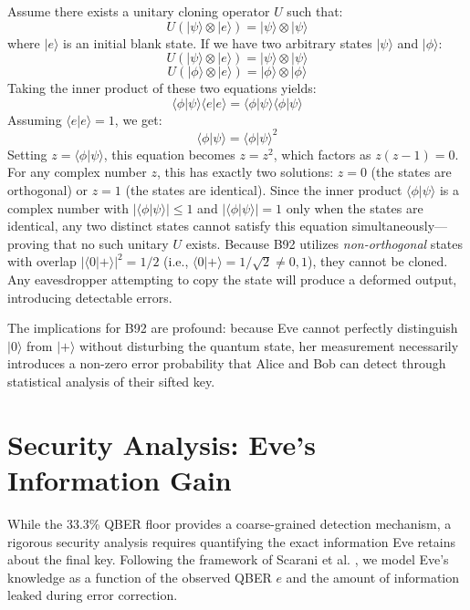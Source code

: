 \documentclass[conference]{IEEEtran}
\begin{document}
Assume there exists a unitary cloning operator $U$ such that:
\begin{equation}
U(|\psi\rangle \otimes |e\rangle) = |\psi\rangle \otimes |\psi\rangle
\end{equation}
where $|e\rangle$ is an initial blank state. If we have two arbitrary states $|\psi\rangle$ and $|\phi\rangle$:
\begin{equation}
U(|\psi\rangle \otimes |e\rangle) = |\psi\rangle \otimes |\psi\rangle
\end{equation}
\begin{equation}
U(|\phi\rangle \otimes |e\rangle) = |\phi\rangle \otimes |\phi\rangle
\end{equation}
Taking the inner product of these two equations yields:
\begin{equation}
\langle \phi | \psi \rangle \langle e | e \rangle = \langle \phi | \psi \rangle \langle \phi | \psi \rangle
\end{equation}
Assuming $\langle e | e \rangle = 1$, we get:
\begin{equation}
\langle \phi | \psi \rangle = \langle \phi | \psi \rangle^2
\end{equation}
Setting $z = \langle \phi | \psi \rangle$, this equation becomes $z = z^2$, which factors as $z(z - 1) = 0$. For any complex number $z$, this has exactly two solutions: $z = 0$ (the states are orthogonal) or $z = 1$ (the states are identical). Since the inner product $\langle \phi | \psi \rangle$ is a complex number with $|\langle \phi | \psi \rangle| \leq 1$ and $|\langle \phi | \psi \rangle| = 1$ only when the states are identical, any two distinct states cannot satisfy this equation simultaneously—proving that no such unitary $U$ exists. Because B92 utilizes \textit{non-orthogonal} states with overlap $|\langle 0 | {+} \rangle|^2 = 1/2$ (i.e., $\langle 0 | {+} \rangle = 1/\sqrt{2} \neq 0, 1$), they cannot be cloned. Any eavesdropper attempting to copy the state will produce a deformed output, introducing detectable errors.


The implications for B92 are profound: because Eve cannot perfectly distinguish $|0\rangle$ from $|+\rangle$ without disturbing the quantum state, her measurement necessarily introduces a non-zero error probability that Alice and Bob can detect through statistical analysis of their sifted key.

\section{Security Analysis: Eve's Information Gain}\label{sec:security}
While the 33.3\% QBER floor provides a coarse-grained detection mechanism, a rigorous security analysis requires quantifying the exact information Eve retains about the final key. Following the framework of Scarani et al. \cite{scarani2009security}, we model Eve's knowledge as a function of the observed QBER $e$ and the amount of information leaked during error correction.
\end{document}
